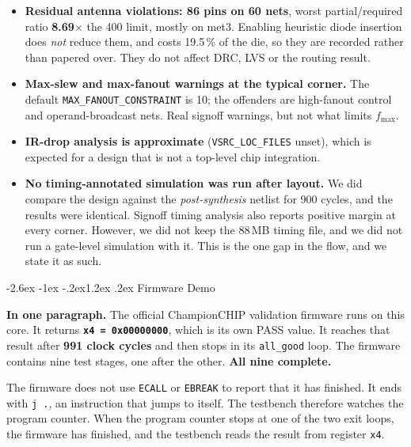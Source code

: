 \documentclass[11pt,a4paper]{article}
\makeatletter
\renewcommand\section{\@startsection{section}{1}{\z@}%
  {-2.6ex \@plus -1ex \@minus -.2ex}{1.2ex \@plus.2ex}%
  {\color{rvbl}\normalfont\large\bfseries}}
\newcommand{\ub}{\_\discretionary{}{}{}}     %
\makeatother
\begin{document}
\begin{itemize}
\item \textbf{Residual antenna violations: 86 pins on 60 nets}, worst partial/required ratio
  \textbf{8.69$\times$} the 400 limit, mostly on met3. Enabling heuristic diode insertion
  does \emph{not} reduce them, and costs 19.5\,\% of the die, so they are recorded rather
  than papered over. They do not affect DRC, LVS or the routing result.
\item \textbf{Max-slew and max-fanout warnings at the typical corner.} The default
  \texttt{MAX\ub FANOUT\ub CONSTRAINT} is 10; the offenders are high-fanout control and
  operand-broadcast nets. Real signoff warnings, but not what limits $f_\text{max}$.
\item \textbf{IR-drop analysis is approximate} (\texttt{VSRC\_LOC\_FILES} unset), which is
  expected for a design that is not a top-level chip integration.
\item \textbf{No timing-annotated simulation was run after layout.} We did compare the
  design against the \emph{post-synthesis} netlist for 900 cycles, and the results were
  identical. Signoff timing analysis also reports positive margin at every corner. However,
  we did not keep the 88\,MB timing file, and we did not run a gate-level simulation with it.
  This is the one gap in the flow, and we state it as such.
\end{itemize}


\section{Firmware Demo}
\label{sec:firmware}

\textbf{In one paragraph.} The official ChampionCHIP validation firmware runs on this core.
It returns \textbf{\texttt{x4 = 0x00000000}}, which is its own PASS value. It reaches that
result after \textbf{991 clock cycles} and then stops in its \texttt{all\_good} loop. The
firmware contains nine test stages, one after the other. \textbf{All nine complete.}

The firmware does not use \texttt{ECALL} or \texttt{EBREAK} to report that it has finished.
It ends with \texttt{j .}, an instruction that jumps to itself. The testbench therefore
watches the program counter. When the program counter stops at one of the two exit loops,
the firmware has finished, and the testbench reads the result from register \texttt{x4}.
\end{document}
